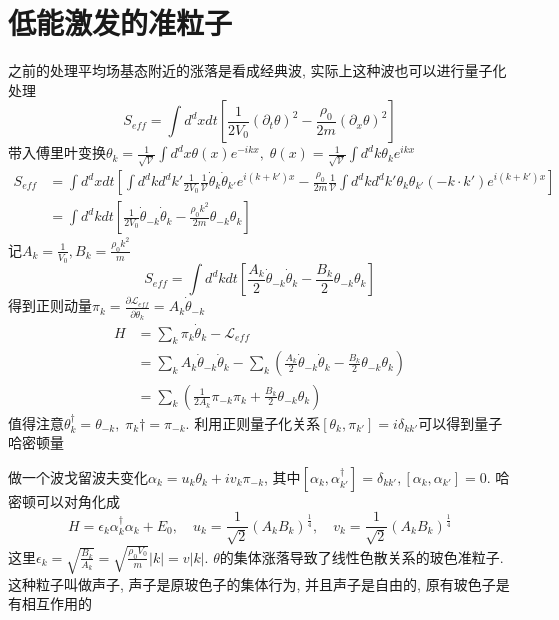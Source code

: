 \documentclass[a4paper,11pt]{article}
\begin{document}
\section{低能激发的准粒子}
之前的处理平均场基态附近的涨落是看成经典波, 实际上这种波也可以进行量子化处理
\begin{equation*}
  S_{eff}=\int d^dxdt\left[\frac{1}{2V_0}(\partial_t\theta)^2-\frac{\rho_0}{2m}(\partial_x\theta)^2\right]
\end{equation*}
带入傅里叶变换$\theta_k=\frac{1}{\sqrt{\mathcal{V}}}\int d^dx\theta(x)e^{-ikx},\;\theta(x)=\frac{1}{\sqrt{\mathcal{V}}}\int d^dk\theta_ke^{ikx}$
\begin{equation*}
  \begin{split}
     S_{eff}&=\int d^dxdt\left[\int d^dkd^dk'\frac{1}{2V_0}\frac{1}{\mathcal{V}}\dot{\theta}_k\dot{\theta}_{k'}e^{i(k+k')x}-\frac{\rho_0}{2m}\frac{1}{\mathcal{V}}\int d^dkd^dk'\theta_k\theta_{k'}(-k\cdot k')e^{i(k+k')x}\right]\\
       &=\int d^dkdt\left[\frac{1}{2V_0}\dot{\theta}_{-k}\dot{\theta}_{k}-\frac{\rho_0k^2}{2m}\theta_{-k}\theta_k\right]
  \end{split}
\end{equation*}
记$A_k=\frac{1}{V_0},B_k=\frac{\rho_0k^2}{m}$
\begin{equation*}
  S_{eff}=\int d^dkdt\left[\frac{A_k}{2}\dot{\theta}_{-k}\dot{\theta}_{k}-\frac{B_k}{2}\theta_{-k}\theta_k\right]
\end{equation*}
得到正则动量$\pi_k=\frac{\partial\mathcal{L}_{eff}}{\partial{\dot{\theta}_k}}=A_{k}\dot{\theta}_{-k}$
\begin{equation*}
  \begin{split}
     H&=\sum_{k}\pi_k\dot{\theta}_k-\mathcal{L}_{eff}\\
       &=\sum_{k}A_k\dot{\theta}_{-k}\dot{\theta}_k-\sum_{k}(\frac{A_k}{2}\dot{\theta}_{-k}\dot{\theta}_k-\frac{B_k}{2}\theta_{-k}\theta_k)\\
       &=\sum_{k}\left(\frac{1}{2A_k}\pi_{-k}\pi_{k}+\frac{B_k}{2}\theta_{-k}\theta_k\right)
  \end{split}
\end{equation*}
值得注意$\theta_k^\dag=\theta_{-k},\;\pi_k\dag=\pi_{-k}$. 利用正则量子化关系$[\theta_k,\pi_{k'}]=i\delta_{kk'}$可以得到量子哈密顿量

做一个波戈留波夫变化$\alpha_k=u_k\theta_k+iv_k\pi_{-k}$, 其中$[\alpha_k,\alpha_{k'}^\dag]=\delta_{kk'},[\alpha_k,\alpha_{k'}]=0$. 哈密顿可以对角化成
\begin{equation*}
  H=\epsilon_{k}\alpha_k^\dag\alpha_k+E_0,\quad u_k=\frac{1}{\sqrt{2}}(A_kB_k)^{\frac{1}{4}},\quad v_k=\frac{1}{\sqrt{2}}(A_kB_k)^{\frac{1}{4}}
\end{equation*}
这里$\epsilon_k=\sqrt{\frac{B_k}{A_k}}=\sqrt{\frac{\rho_0V_0}{m}}|k|=v|k|$. $\theta$的集体涨落导致了线性色散关系的玻色准粒子. 这种粒子叫做声子, 声子是原玻色子的集体行为, 并且声子是自由的, 原有玻色子是有相互作用的
\end{document}

